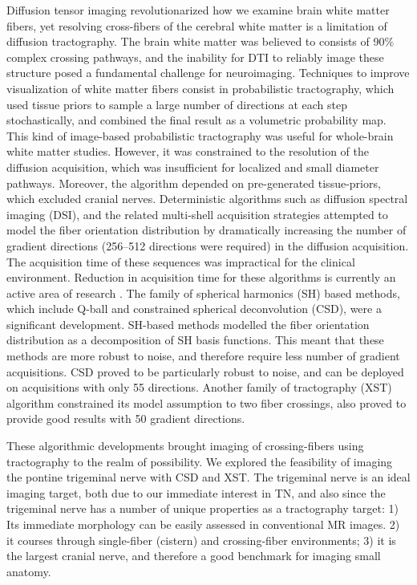 Diffusion tensor imaging revolutionarized how we examine brain white matter fibers, yet resolving cross-fibers of the cerebral white matter is a limitation of diffusion tractography. The brain white matter was believed to consists of 90\% complex crossing pathways, and the inability for DTI to reliably image these structure posed a fundamental challenge for neuroimaging. 
Techniques to improve visualization of white matter fibers consist in probabilistic tractography, which used tissue priors to sample a large number of directions at each step stochastically, and combined the final result as a volumetric probability map. This kind of image-based probabilistic tractography was useful for whole-brain white matter studies. However, it was constrained to the resolution of the diffusion acquisition, which was insufficient for localized and small diameter pathways. Moreover, the algorithm depended on pre-generated tissue-priors, which excluded cranial nerves. 
Deterministic algorithms such as diffusion spectral imaging (DSI), and the related multi-shell acquisition strategies attempted to model the fiber orientation distribution by dramatically increasing the number of gradient directions (256--512 directions were required) in the diffusion acquisition. The acquisition time of these sequences was impractical for the clinical environment. Reduction in acquisition time for these algorithms is currently an active area of research \cite{}.
The family of spherical harmonics (SH) based methods, which include Q-ball and constrained spherical deconvolution (CSD), were a significant development. SH-based methods modelled the fiber orientation distribution as a decomposition of SH basis functions. This meant that these methods are more robust to noise, and therefore require less number of gradient acquisitions. CSD proved to be particularly robust to noise, and can be deployed on acquisitions with only 55 directions. Another family of tractography (XST) algorithm constrained its model assumption to two fiber crossings, also proved to provide good results with 50 gradient directions.

These algorithmic developments brought imaging of crossing-fibers using tractography to the realm of possibility. We explored the feasibility of imaging the pontine trigeminal nerve with CSD and XST. The trigeminal nerve is an ideal imaging target, both due to our immediate interest in TN, and also since the trigeminal nerve has a number of unique properties as a tractography target: 1) Its immediate morphology can be easily assessed in conventional MR images. 2) it courses through single-fiber (cistern) and crossing-fiber environments; 3) it is the largest cranial nerve, and therefore a good benchmark for imaging small anatomy.


